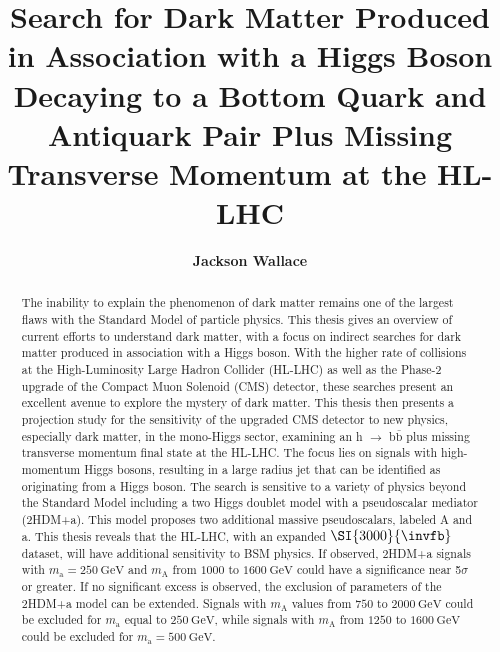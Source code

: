 \documentclass[12pt, letterpaper]{report}
\title{\textbf{Search for Dark Matter Produced in Association with a Higgs Boson Decaying to a Bottom Quark and Antiquark Pair Plus Missing Transverse Momentum at the HL-LHC}}
\author{\textbf{Jackson Wallace}}
\DeclareRobustCommand{\GeV}[1]{\ensuremath{\SI{#1}{\GeV}}}
\newcommand{\fbinv}[1]{\SI{#1}{\invfb}}
\numberwithin{equation}{chapter}
\begin{document}
\maketitle
\tableofcontents


\begin{abstract}
The inability to explain the phenomenon of dark matter remains one of the largest flaws with the Standard Model of particle physics.
This thesis gives an overview of current efforts to understand dark matter, with a focus on indirect searches for dark matter produced in association with a Higgs boson. 
With the higher rate of collisions at the High-Luminosity Large Hadron Collider (HL-LHC) as well as the  Phase-2 upgrade of the Compact Muon Solenoid (CMS) detector, these searches present an excellent avenue to explore the mystery of dark matter. 
This thesis then presents a projection study for the sensitivity of the upgraded CMS detector to new physics, especially dark matter, in the mono-Higgs sector, examining an h $\to$ b$\bar{\mathrm{b}}$ plus missing transverse momentum final state at the HL-LHC.
The focus lies on signals with high-momentum Higgs bosons, resulting in a large radius jet that can be identified as originating from a Higgs boson.
The search is sensitive to a variety of physics beyond the Standard Model including a two Higgs doublet model with a pseudoscalar mediator (2HDM+a). This model proposes two additional massive pseudoscalars, labeled A and a. This thesis reveals that the HL-LHC, with an expanded $\fbinv{3000}$ dataset, will have additional sensitivity to BSM physics. If observed, 2HDM+a signals with $m_\mathrm{a} = \GeV{250}$ and $m_\mathrm{A}$ from $1000$ to $\GeV{1600}$ could have a significance near 5$\sigma$ or greater.
If no significant excess is observed, the exclusion of parameters of the 2HDM+a model can be extended. Signals with $m_\mathrm{A}$ values from $750$ to $\GeV{2000}$ could be excluded for $m_\mathrm{a}$ equal to $\GeV{250}$, while signals with $m_\mathrm{A}$ from $1250$ to $\GeV{1600}$ could be excluded for $m_\mathrm{a} = \GeV{500}$. 
\end{abstract}











\appendix


\titleformat{\chapter}{}{}{0em}{\bf\LARGE}

\clearpage



\clearpage
{}

\end{document}
